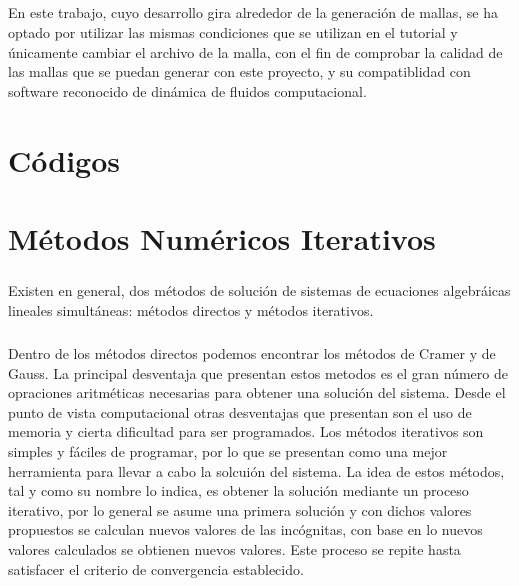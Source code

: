 \documentclass[letterpaper, openright, 12pt]{book}
\begin{document}
    \paragraph*{}
    En este trabajo, cuyo desarrollo gira alrededor de la generación de mallas,
    se ha optado por utilizar las mismas condiciones que se utilizan en el
    tutorial y únicamente cambiar el archivo de la malla, con el fin de
    comprobar la calidad de las mallas que se puedan generar con este proyecto,
    y su compatiblidad con software reconocido de dinámica de fluidos computacional.

%
%
%
%
%

%
%
%
%
%
\appendix
\chapter{Códigos}\label{appCode}

%
%
%
%
%

%
%
%
%
%
\chapter{Métodos Numéricos Iterativos}\label{appIter}
    \paragraph*{}
        Existen en general, dos métodos de solución de sistemas de ecuaciones
        algebráicas lineales simultáneas: métodos directos y métodos iterativos.

    \paragraph*{}
        Dentro de los métodos directos podemos encontrar los métodos de Cramer y
        de Gauss. La principal desventaja que presentan estos metodos es el gran
        número de opraciones aritméticas necesarias para obtener una solución
        del sistema. Desde el punto de vista computacional otras desventajas que
        presentan son el uso de memoria y cierta dificultad para ser programados.
        Los métodos iterativos son simples y fáciles de programar, por lo que se
        presentan como una mejor herramienta para llevar a cabo la solcuión del
        sistema. La idea de estos métodos, tal y como su nombre lo indica, es
        obtener la solución mediante un proceso iterativo, por lo general se
        asume una primera solución y con dichos valores propuestos se calculan
        nuevos valores de las incógnitas, con base en lo nuevos valores
        calculados se obtienen nuevos valores. Este proceso se repite hasta
        satisfacer el criterio de convergencia establecido.
\end{document}
